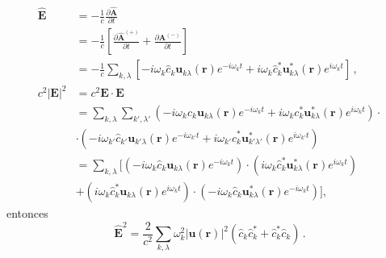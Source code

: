 \begin{align}
  \hat{\mathbf{E}}           & = -\frac{1}{c} \frac{\partial \hat{\mathbf{A}}}{\partial t}                                                                                                                                                         \nonumber \\
                             & =-\frac{1}{c}\left[ \frac{\partial \hat{\mathbf{A}}^{(+)}}{\partial t} + \frac{\partial \mathbf{A}^{(-)}}{\partial t} \right]                                                                                       \nonumber \\
                             & = -\frac{1}{c} \sum_{k,\lambda} \left[ -i\omega_{k}\hat{c}_{k} \mathbf{u}_{k\lambda} (\mathbf{r})e^{-i\omega_k t} +  i\omega_{k}\hat{c}_{k}^* \mathbf{u}_{k\lambda}^* (\mathbf{r})e^{i\omega_{k} t} \right] \,,     \nonumber \\
  c^2 \vert\mathbf{E}\vert^2 & = c^2 \mathbf{E} \cdot \mathbf{E}                                                                                                                                                                                   \nonumber \\
                             & = \sum_{k,\lambda}\sum_{k',\lambda'}\left(-i\omega_{k}\hat{c}_{k}\mathbf{u}_{k\lambda} (\mathbf{r})e^{-i\omega_{k}t} + i \omega_{k} c^{*}_{k}\mathbf{u}^{*}_{k\lambda}(\mathbf{r})e^{i\omega_{k}t} \right)\cdot     \nonumber \\
                             & \cdot \left(-i\omega_{k'}\hat{c}_{k'}\mathbf{u}_{k'\lambda} (\mathbf{r})e^{-i\omega_{k'}t} + i \omega_{k'} \hat{c}^{*}_{k}\mathbf{u}^{*}_{k'\lambda'}(\mathbf{r})e^{i\omega_{k'}t} \right)                          \nonumber \\
                             & = \sum_{k,\lambda} \Big[ \left(-i\omega_{k}\hat{c}_{k} \mathbf{u}_{k\lambda} (\mathbf{r})e^{-i\omega_k t}\right)\cdot \left( i\omega_{k}\hat{c}_{k}^* \mathbf{u}_{k\lambda}^* (\mathbf{r})e^{i\omega_{k} t} \right) \nonumber \\
                             & +  \left(i\omega_{k}\hat{c}_{k}^* \mathbf{u}_{k\lambda} (\mathbf{r})e^{i\omega_{k} t}\right)\cdot \left(-i\omega_{k}\hat{c}_{k} \mathbf{u}_{k\lambda}^* (\mathbf{r})e^{-i\omega_k t}\right) \Big],
\end{align}
entonces
\begin{equation}
  \label{EM.18}
  \hat{\mathbf{E}}^2 = \frac{2}{c^2}\sum_{k,\lambda} \omega_{k}^2  |\mathbf{u}(\mathbf{r})|^2 \left( \hat{c}_{k} \hat{c}_{k}^* + \hat{c}_{k}^* \hat{c}_{k} \right) \,.
\end{equation}
